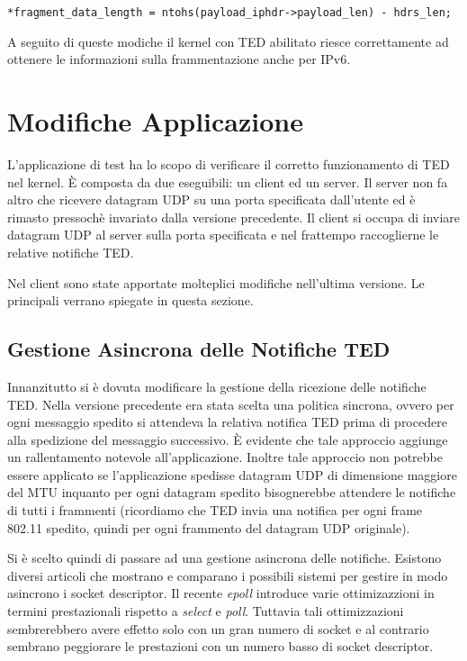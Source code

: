 \documentclass[a4paper,10pt]{article}
\begin{document}
\begin{lstlisting}
*fragment_data_length = ntohs(payload_iphdr->payload_len) - hdrs_len;
\end{lstlisting}

A seguito di queste modiche il kernel con TED abilitato riesce
correttamente ad ottenere le informazioni sulla frammentazione anche per
IPv6.

\section{Modifiche Applicazione}
\label{sec:app}
L'applicazione di test ha lo scopo di verificare il corretto
funzionamento di TED nel kernel. È composta da due eseguibili: un client
ed un server. Il server non fa altro che ricevere datagram UDP su una
porta specificata dall'utente ed è rimasto pressochè invariato
dalla versione precedente. Il client si occupa di inviare datagram UDP al
server sulla porta specificata e nel frattempo raccoglierne le relative 
notifiche TED.

Nel client sono state apportate molteplici modifiche nell'ultima
versione. Le principali verrano spiegate in questa
sezione.
\subsection{Gestione Asincrona delle Notifiche TED}
Innanzitutto si è dovuta modificare la gestione della
ricezione delle notifiche TED. Nella versione precedente era stata scelta
una politica sincrona, ovvero per ogni messaggio spedito si attendeva
la relativa
notifica TED prima di procedere alla spedizione del messaggio
successivo. È evidente che tale approccio aggiunge un rallentamento
notevole all'applicazione. 
Inoltre tale approccio non potrebbe essere applicato se
l'applicazione spedisse datagram UDP di dimensione maggiore del MTU
inquanto per ogni datagram spedito bisognerebbe attendere le notifiche
di tutti i frammenti (ricordiamo che TED invia una notifica per ogni
frame 802.11 spedito, quindi per ogni frammento del datagram UDP
originale).

Si è scelto quindi di passare ad una gestione asincrona delle notifiche.
Esistono diversi articoli\cite{polling1,polling2} che mostrano e
comparano i possibili sistemi per gestire in modo asincrono i socket
descriptor.
Il recente \emph{epoll} introduce varie ottimizazzioni in termini
prestazionali rispetto a \emph{select} e \emph{poll}.
Tuttavia tali ottimizzazioni sembrerebbero avere effetto solo con un
gran numero di socket e al contrario sembrano peggiorare le prestazioni con
un numero basso di socket descriptor. 
\end{document}
